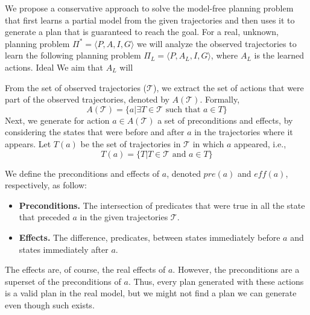 

We propose a conservative approach to solve the model-free planning problem
that first learns a partial model from the given trajectories and then uses it to generate a plan that is guaranteed to reach the goal. For a real, unknown, planning problem $\Pi^*=\langle P,A,I,G\rangle$ we will analyze the observed trajectories to learn the following planning problem $\Pi_L=\langle P,A_L,I,G\rangle$, where $A_L$ is the learned actions. 
Ideal
We aim that $A_L$ will 


From the set of observed trajectories ($\mathcal{T}$), we extract the set of actions that were part of the observed trajectories, 
denoted by $A(\mathcal{T})$. Formally,
\[ A(\mathcal{T})=\{a | \exists T\in\mathcal{T} \text{~such that~} a\in T\} \]
Next, we generate for action $a\in A(\mathcal{T})$ a set of preconditions and effects, by considering the states that were before and after $a$ in the trajectories where it appears. 
Let $T(a)$ be the set of trajectories in $\mathcal{T}$ in which $a$ appeared, i.e., 
\[ T(a)=\{T | T\in \mathcal{T} \text{~and~} a\in T\} \]


We define the preconditions and effects of $a$, denoted $pre(a)$ and $eff(a)$, respectively, as follow:
\begin{itemize}
    \item {\bf Preconditions.} The intersection of predicates that were true in all the state that preceded $a$ in the given trajectories $\mathcal{T}$. 
    \item {\bf Effects.} The difference, predicates, between states immediately before $a$ and states immediately after $a$. 
\end{itemize}

The effects are, of course, the real effects of $a$. However, the preconditions are a superset of the preconditions of $a$. Thus, every plan generated with these actions is a valid plan in the real model, but we might not find a plan we can generate even though such exists. 

